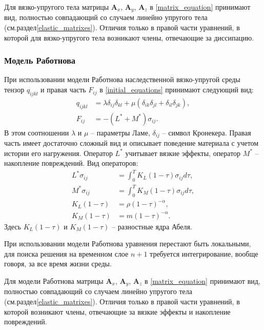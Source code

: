 Для вязко-упругого тела матрицы $\mathbf{A}_x$, $\mathbf{A}_y$, $\mathbf{A}_z$ в \ref{matrix_equation} принимают вид, полностью совпадающий со случаем линейно упругого тела (см.раздел\ref{elastic_matrixes}). Отличия только в правой части уравнений, в которой для вязко-упругого тела возникают члены, отвечающие за диссипацию.


\subsubsection{Модель Работнова}
\label{rabotnov_matrixes}

При использовании модели Работнова наследственной вязко-упругой среды тензор $q_{ijkl}$ и правая часть $F_{ij}$ в \ref{initial_equations} принимают следующий вид:
\begin{align}
\label{tensor_qijkl_rabotnov}
q_{ijkl}&=\lambda\delta_{ij}\delta_{kl}+\mu(\delta_{ik}\delta_{jl}+\delta_{il}
\delta_{jk}),\nonumber\\
F_{ij}&=-(L^*+M^*)\sigma_{ij}.
\end{align}
В этом соотношении $\lambda$ и $\mu$ -- параметры Ламе, $\delta_{ij}$ -- символ Кронекера. Правая часть имеет достаточно сложный вид и описывает поведение материала с учетом истории его нагружения. Оператор $L^*$ учитывает вязкие эффекты, оператор $M^*$ -- накопление повреждений. Вид операторов:
\begin{align}
\label{right_hand_rabotnov}
L^*\sigma_{ij} &= \int_0^T{K_L(1-\tau)\sigma_{ij}d\tau}, \nonumber\\
M^*\sigma_{ij} &= \int_0^T{K_M(1-\tau)\sigma_{ij}d\tau}, \nonumber\\
K_L(1-\tau)&=\rho(1-\tau)^{-\alpha}, \nonumber\\
K_M(1-\tau)&=m(1-\tau)^{-\alpha}.
\end{align}
Здесь $K_L(1-\tau)$ и $K_M(1-\tau)$ -- разностные ядра Абеля.

При использовании модели Работнова уравнения перестают быть локальными, для поиска решения на временном слое $n+1$ требуется интегрирование, вообще говоря, за все время жизни среды.

Для модели Работнова матрицы $\mathbf{A}_x$, $\mathbf{A}_y$, $\mathbf{A}_z$ в \ref{matrix_equation} принимают вид, полностью совпадающий со случаем линейно упругого тела (см.раздел\ref{elastic_matrixes}). Отличия только в правой части уравнений, в которой возникают члены, отвечающие за вязкие эффекты и накопление повреждений.

\clearpage
\newpage

